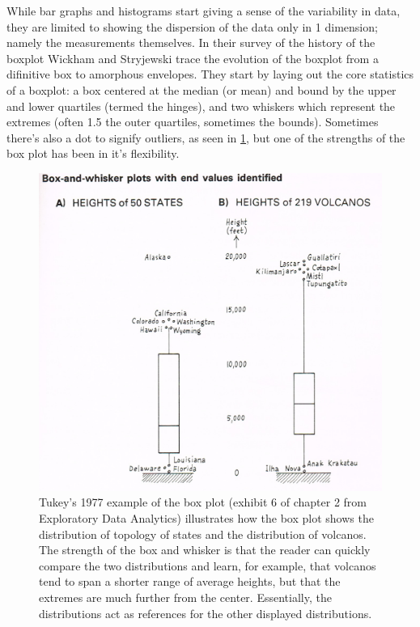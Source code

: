 While bar graphs and histograms start giving a sense of the variability in
data, they are limited to showing the dispersion of the data only in 1
dimension; namely the measurements themselves. In their survey of the history
of the boxplot \cite{wickham11} Wickham and Stryjewski trace the evolution of
the boxplot from a difinitive box to amorphous envelopes.  They start by laying out
the core statistics of a boxplot: a box centered at the median (or mean) and
bound by the upper and lower quartiles (termed the hinges), and two whiskers which represent the
extremes (often 1.5 the outer quartiles, sometimes the \alpha bounds). Sometimes there's
also a dot to signify outliers, as seen in \ref{fig:boxplot}, but one of
the strengths of the box plot has been in it's flexibility. 

\begin{figure}
\includegraphics{figs/boxplot.png}
\caption{Tukey's 1977 example of the box plot (exhibit 6 of chapter 2 from
Exploratory Data Analytics\cite{tukey77e}) illustrates how the box plot shows
the distribution of topology of states and
the distribution of volcanos. The strength of the box and whisker is that the
reader can quickly compare the two distributions and learn, for example, that
volcanos tend to span a shorter range of average heights, but that the extremes
are much further from the center. Essentially, the distributions act as
references for the other displayed distributions.}
\label{fig:boxplot}
\end{figure}

